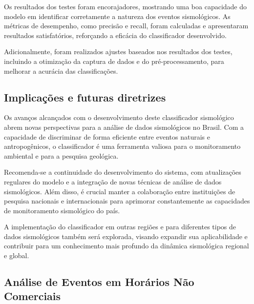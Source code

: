 \par{Os resultados dos testes foram encorajadores, mostrando uma boa capacidade do modelo em identificar corretamente a natureza dos eventos sismológicos. As métricas de desempenho, como precisão e recall, foram calculadas e apresentaram resultados satisfatórios, reforçando a eficácia do classificador desenvolvido.}

\par{Adicionalmente, foram realizados ajustes baseados nos resultados dos testes, incluindo a otimização da captura de dados e do pré-processamento, para melhorar a acurácia das classificações.}

\subsection{Implicações e futuras diretrizes}
\label{subsec:implicacoes}
\par{Os avanços alcançados com o desenvolvimento deste classificador sismológico abrem novas perspectivas para a análise de dados sismológicos no Brasil. Com a capacidade de discriminar de forma eficiente entre eventos naturais e antropogênicos, o classificador é uma ferramenta valiosa para o monitoramento ambiental e para a pesquisa geológica.}

\par{Recomenda-se a continuidade do desenvolvimento do sistema, com atualizações regulares do modelo e a integração de novas técnicas de análise de dados sismológicos. Além disso, é crucial manter a colaboração entre instituições de pesquisa nacionais e internacionais para aprimorar constantemente as capacidades de monitoramento sismológico do país.}

\par{A implementação do classificador em outras regiões e para diferentes tipos de dados sismológicos também será explorada, visando expandir sua aplicabilidade e contribuir para um conhecimento mais profundo da dinâmica sismológica regional e global.}

\subsection{Análise de Eventos em Horários Não Comerciais}
\label{subsec:nao_comerciais}



